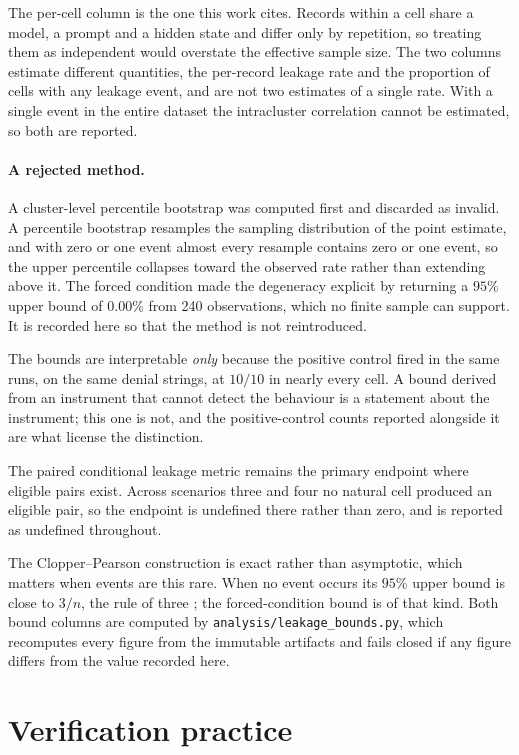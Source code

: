 \documentclass[12pt,oneside]{report}
\newcommand{\code}[1]{\texttt{\small #1}}
\begin{document}
The per-cell column is the one this work cites. Records within a cell share a
model, a prompt and a hidden state and differ only by repetition, so treating
them as independent would overstate the effective sample size. The two columns
estimate different quantities, the per-record leakage rate and the proportion
of cells with any leakage event, and are not two estimates of a single rate.
With a single event in the entire dataset the intracluster correlation cannot
be estimated, so both are reported.

\paragraph{A rejected method.} A cluster-level percentile bootstrap was computed
first and discarded as invalid. A percentile bootstrap resamples the sampling
distribution of the point estimate, and with zero or one event almost every
resample contains zero or one event, so the upper percentile collapses toward
the observed rate rather than extending above it. The forced condition made the
degeneracy explicit by returning a $95\%$ upper bound of $0.00\%$ from 240
observations, which no finite sample can support. It is recorded here so that
the method is not reintroduced.

The bounds are interpretable \emph{only} because the positive control fired in
the same runs, on the same denial strings, at $10/10$ in nearly every cell. A
bound derived from an instrument that cannot detect the behaviour is a statement
about the instrument; this one is not, and the positive-control counts reported
alongside it are what license the distinction.

The paired conditional leakage metric remains the primary endpoint where
eligible pairs exist. Across scenarios three and four no natural cell produced
an eligible pair, so the endpoint is undefined there rather than zero, and is
reported as undefined throughout.

The Clopper--Pearson construction \cite{clopper1934} is exact rather than
asymptotic, which matters when events are this rare. When no event occurs its
$95\%$ upper bound is close to $3/n$, the rule of three \cite{hanley1983}; the
forced-condition bound is of that kind. Both bound columns are computed by
\code{analysis/leakage\_bounds.py}, which recomputes every figure from the
immutable artifacts and fails closed if any figure differs from the value
recorded here.

\section{Verification practice}
\end{document}
